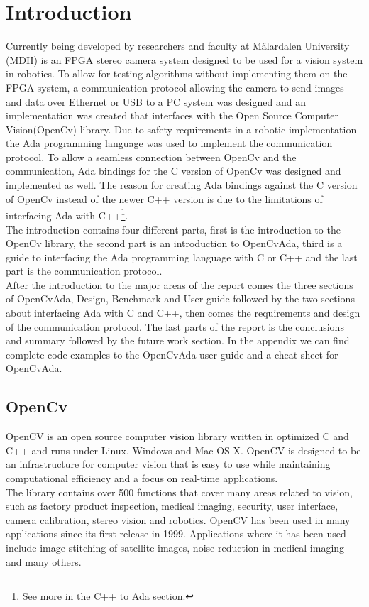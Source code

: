 \chapter{Introduction}
Currently being developed by researchers and faculty at Mälardalen University (MDH) is an FPGA stereo camera system designed to be used for a vision system in robotics. To allow for testing algorithms without implementing them on the FPGA system, a communication protocol allowing the camera to send images and data over Ethernet or USB to a PC system was designed and an implementation was created that interfaces with the Open Source Computer Vision\cite{opencv2011}(OpenCv) library. Due to safety requirements in a robotic implementation the Ada programming language was used to implement the communication protocol. To allow a seamless connection between OpenCv and the communication, Ada bindings for the C version of OpenCv was designed and implemented as well. The reason for creating Ada bindings against the C version of OpenCv instead of the newer C++ version is due to the limitations of interfacing Ada with C++\footnote{See more in the C++ to Ada section.}.
\\
The introduction contains four different parts, first is the introduction to the OpenCv library, the second part is an introduction to OpenCvAda, third is a guide to interfacing the Ada programming language with C or C++ and the last part is the communication protocol.
\\
After the introduction to the major areas of the report comes the three sections of OpenCvAda, Design, Benchmark and User guide followed by the two sections about interfacing Ada with C and C++, then comes the requirements and design of the communication protocol. The last parts of the report is the conclusions and summary followed by the future work section. In the appendix we can find complete code examples to the OpenCvAda user guide and a cheat sheet for OpenCvAda.
\section{OpenCv}
OpenCV is an open source computer vision library written in optimized C and C++ and runs under Linux, Windows and Mac OS X. OpenCV is designed to be an infrastructure for computer vision that is easy to use while maintaining computational efficiency and a focus on real-time applications.
\\
The library contains over 500 functions that cover many areas related to vision, such as factory product inspection, medical imaging, security, user interface, camera calibration, stereo vision and robotics. OpenCV has been used in many applications since its first release in 1999. Applications where it has been used include image stitching of satellite images, noise reduction in medical imaging and many others.

